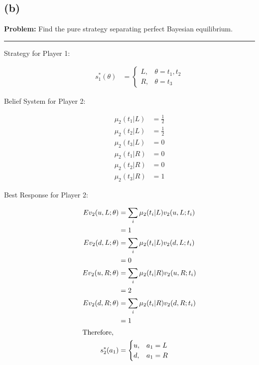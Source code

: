 \documentclass[10pt]{extarticle}
\begin{document}
    \subsection{(b)}%
    \textbf{Problem:} Find the pure strategy separating perfect Bayesian equilibrium.
    \begin{center}
    \rule{\textwidth}{0.4pt}
    \end{center}
    \begin{description}
      \item[Strategy for Player 1:]
        \begin{align*}
          s_1^{\ast}(\theta) &= \begin{cases}
            L, & \theta = t_1,t_2\\
            R, & \theta = t_3
          \end{cases}
        \end{align*}
      \item[Belief System for Player 2:]
        \begin{align*}
          \mu_2(t_1|L) &= \frac{1}{2}\\
          \mu_2(t_2|L) &= \frac{1}{2}\\
          \mu_2(t_3|L) &= 0\\
          \mu_2(t_1|R) &= 0\\
          \mu_2(t_2|R) &= 0\\
          \mu_2(t_3|R) &= 1
        \end{align*}
      \item[Best Response for Player 2:]
        \begin{align*}
          Ev_2(u,L;\theta) &= \sum_{i}\mu_2(t_i|L)v_2(u,L;t_i)\\
                           &= 1\\
          Ev_2(d,L;\theta) &= \sum_{i}\mu_2(t_i|L)v_2(d,L;t_i)\\
                           &= 0\\
          Ev_2(u,R;\theta) &= \sum_{i} \mu_2(t_i|R)v_2(u,R;t_i)\\
                           &= 2\\
          Ev_2(d,R;\theta) &= \sum_{i}\mu_2(t_i|R) v_2(d,R;t_i)\\
                           &= 1\\
                           \shortintertext{Therefore,}
          s_2^{\ast}(a_1) &= \begin{cases}
            u,&a_1 = L\\
            d,&a_1 = R

\end{cases}
\end{align*}
\end{description}
\end{document}
